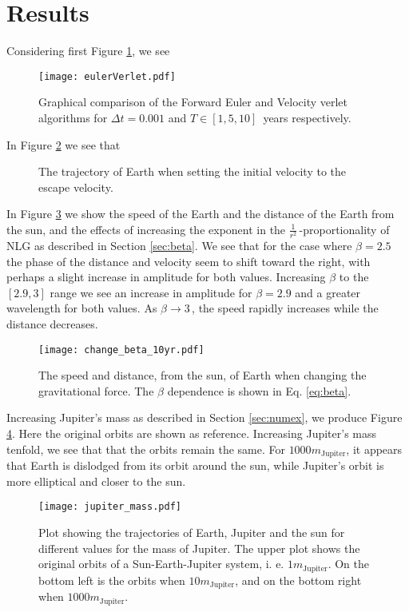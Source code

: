 \section{Results}
\label{sec:results}

Considering first Figure \ref{fig:compare euler verlet}, we see
\begin{figure}[htbp]
	\centering
	\texttt{[image: eulerVerlet.pdf]}
	\caption{Graphical comparison of the Forward Euler and Velocity verlet algorithms for $\Delta t = 0.001$ and $T \in [1, 5, 10]\,$ years respectively.}
	\label{fig:compare euler verlet}
\end{figure}


In Figure \ref{fig:earth escape} we see that
\begin{figure}[htbp]
	\centering
	\caption{The trajectory of Earth when setting the initial velocity to the escape velocity.}
	\label{fig:earth escape}
\end{figure}

In Figure \ref{fig:changing beta} we show the speed of the Earth and the distance of the Earth from the sun, and the effects of increasing the exponent in the $\frac{1}{r^2}\,$-proportionality of NLG as described in Section \ref{sec:beta}. We see that for the case where $\beta=2.5$ the phase of the distance and velocity seem to shift toward the right, with perhaps a slight increase in amplitude for both values. Increasing $\beta$ to the $[2.9, 3]$ range we see an increase in amplitude for $\beta = 2.9$ and a greater wavelength for both values. As $\beta \rightarrow 3\,$, the speed rapidly increases while the distance decreases.
\begin{figure}[htbp]
	\centering
	\texttt{[image: change\_beta\_10yr.pdf]}
	\caption{The speed and distance, from the sun, of Earth when changing the gravitational force. The $\beta$ dependence is shown in Eq. \ref{eq:beta}.}
	\label{fig:changing beta}
\end{figure}

Increasing Jupiter's mass as described in Section \ref{sec:numex}, we produce Figure \ref{fig:jupiter mass}. Here the original orbits are shown as reference. Increasing Jupiter's mass tenfold, we see that that the orbits remain the same.
For $1000m_{\text{Jupiter}}$, it appears that Earth is dislodged from its orbit around the sun, while Jupiter's orbit is more elliptical and closer to the sun.
\begin{figure}[htbp]
	\centering
	\texttt{[image: jupiter\_mass.pdf]}
	\caption{Plot showing the trajectories of Earth, Jupiter and the sun for different values for the mass of Jupiter. The upper plot shows the original orbits of a Sun-Earth-Jupiter system, i. e. $1m_{\text{Jupiter}}$. On the bottom left is the orbits when $10m_{\text{Jupiter}}$, and on the bottom right when $1000m_{\text{Jupiter}}$.}
	\label{fig:jupiter mass}
\end{figure}

